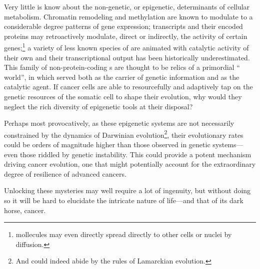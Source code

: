 Very little is know about the non-genetic, or epigenetic, determinants of
cellular metabolism.  Chromatin remodeling and  methylation are
known to modulate to a considerable degree patterns of gene expression;
 transcripts and their encoded proteins may retroactively
modulate, direct or indirectly, the activity of certain
genes;\footnote{ mollecules may even directly spread directly to
  other cells or nuclei by diffusion.} a variety of less known species of
 are animated with catalytic activity of their own and their
transcriptional output has been historically
underestimated.\cite{huttenhofer_principles_2006,ptashne_use_2007}  This family
of non-protein-coding s are thought to be relics of a primordial
`` world'', in which  served both as the carrier
of genetic information and as the catalytic agent.  If cancer cells are able to
resourcefully and adaptively tap on the genetic resources of the somatic cell to
shape their evolution, why would they neglect the rich diversity of epigenetic
tools at their disposal?

Perhaps most provocatively, as these epigenetic systems are not necessarily
constrained by the dynamics of Darwinian evolution\footnote{And could indeed
  abide by the rules of Lamarckian evolution.}, their evolutionary rates could
be orders of magnitude higher than those observed in genetic systems---even
those riddled by genetic instability.  This could provide a potent mechanism
driving cancer evolution, one that might potentially account for the
extraordinary degree of resilience of advanced cancers.


\medskip

Unlocking these mysteries may well require a lot of ingenuity, but without doing
so it will be hard to elucidate the intricate nature of life---and that of
its dark horse, cancer.



